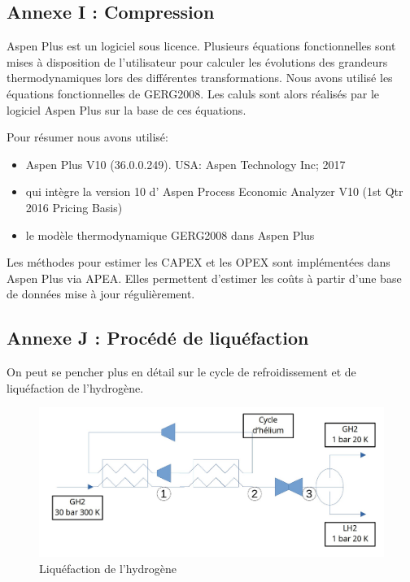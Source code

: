 \documentclass[11pt,french,a4paper]{article}
\begin{document}
\FloatBarrier
\subsection*{Annexe I : Compression}

Aspen Plus est un logiciel sous licence. Plusieurs équations fonctionnelles sont mises à disposition de l'utilisateur pour calculer les évolutions des grandeurs thermodynamiques lors des différentes transformations. Nous avons utilisé les équations fonctionnelles de GERG2008. Les caluls sont alors réalisés par le logiciel Aspen Plus sur la base de ces équations.

Pour résumer nous avons utilisé:
\begin{itemize}
\item Aspen Plus V10 (36.0.0.249). USA: Aspen Technology Inc; 2017
\item qui intègre la version 10 d' Aspen Process Economic Analyzer V10 (1st Qtr 2016 Pricing Basis)
\item  le modèle thermodynamique GERG2008 dans Aspen Plus
\end{itemize}

Les méthodes pour estimer les CAPEX et les OPEX sont implémentées dans Aspen Plus via APEA. Elles permettent d'estimer les coûts à partir d'une base de données mise à jour régulièrement.

\FloatBarrier
\subsection*{Annexe J : Procédé de liquéfaction} 

On peut se pencher plus en détail sur le cycle de refroidissement et  de liquéfaction de l'hydrogène. 

\begin{figure}[h]
  \centering
  \includegraphics[width=0.8\linewidth]{image/annexe/liquefaction/cycle_liqu.jpg}
  \caption{Liquéfaction de l'hydrogène}
\end{figure}
\end{document}
